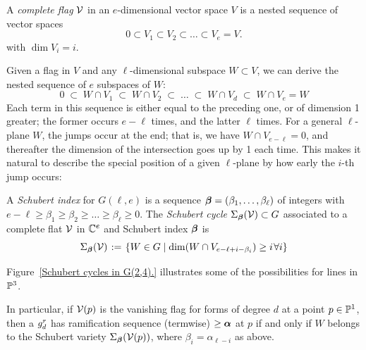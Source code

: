 \begin{definition}
A \emph{complete flag} $\cal V$  in an $e$-dimensional vector space $V$ is a nested sequence of vector spaces
$$
0 \subset V_1 \subset V_2 \subset \dots  \subset V_{e} = V.
$$
with $\dim V_i = i$.
\end{definition}

Given a flag in $V$ and any  $\ell$-dimensional subspace $W \subset V$, we can derive the nested sequence of $e$ subspaces of $W$:
$$
0 \; \subset \; W \cap V_1 \; \subset \;  W \cap V_2 \; \subset \;  \dots \; \subset \;  W \cap V_d \; \subset \;  W \cap V_{e} = W
$$
Each term in this sequence is either equal to the preceding one, or of dimension 1 greater; the former  occurs $e-\ell$ times, and the latter $\ell$ times. For a general $\ell $-plane $W$, the jumps occur at the end; that is, we have $W \cap V_{e-\ell} = 0$, and thereafter the dimension of the intersection goes up by 1 each time. This makes it natural
to describe the special position of a given $\ell $-plane by how early the $i$-th jump occurs: 

\begin{definition}
A \emph{Schubert index} for $G(\ell, e)$ is a sequence ${\bbeta} = (\beta_1,\dots,\beta_{\ell})$ of integers with $e-\ell \geq \beta_1 \geq \beta_2 \geq \dots \geq \beta_{\ell} \geq 0$.
The \emph{Schubert cycle $\Sigma_{\bbeta}({\cal V}) \subset G$} associated to a complete flat $\sV$ in $\CC^e$ and
Schubert index $\bbeta$  is 
$$
\Sigma_{\bbeta}({\cal V}) \; := \; \left\{ W \in G \mid \dim(W \cap V_{e-\ell+i-\beta_i}) \geq i \; \forall i \right\}
$$
\end{definition}
\noindent Figure~\ref{Schubert cycles in G(2,4).} illustrates some of the possibilities for lines in $\PP^3$.

In particular, if $\sV(p)$ is the vanishing flag for forms of degree $d$ at a point $p\in \PP^{1}$, then
a $\grd$ has ramification sequence (termwise) $\geq \balpha$ at $p$ if and only if $W$ belongs
to the Schubert variety $\Sigma_{\bbeta}(\sV(p))$, where $\beta_{i} = \alpha_{\ell-i}$ as above.

 


